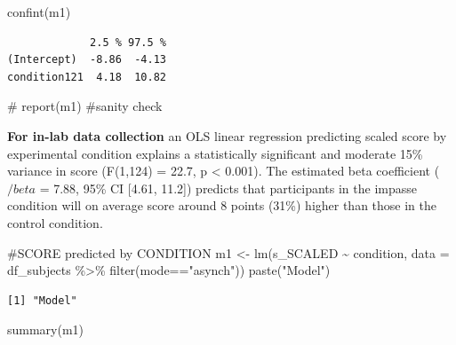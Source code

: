 \documentclass[
  letterpaper,
  DIV=11,
  numbers=noendperiod]{scrreprt}
\newenvironment{Shaded}{\begin{snugshade}}{\end{snugshade}}
\newcommand{\AttributeTok}[1]{\textcolor[rgb]{0.40,0.45,0.13}{#1}}
\newcommand{\CommentTok}[1]{\textcolor[rgb]{0.37,0.37,0.37}{#1}}
\newcommand{\FunctionTok}[1]{\textcolor[rgb]{0.28,0.35,0.67}{#1}}
\newcommand{\NormalTok}[1]{\textcolor[rgb]{0.00,0.23,0.31}{#1}}
\newcommand{\OtherTok}[1]{\textcolor[rgb]{0.00,0.23,0.31}{#1}}
\newcommand{\SpecialCharTok}[1]{\textcolor[rgb]{0.37,0.37,0.37}{#1}}
\newcommand{\StringTok}[1]{\textcolor[rgb]{0.13,0.47,0.30}{#1}}
\begin{document}
\begin{Shaded}
\begin{Highlighting}[]
\FunctionTok{confint}\NormalTok{(m1)}
\end{Highlighting}
\end{Shaded}

\begin{verbatim}
             2.5 % 97.5 %
(Intercept)  -8.86  -4.13
condition121  4.18  10.82
\end{verbatim}

\begin{Shaded}
\begin{Highlighting}[]
\CommentTok{\# report(m1) \#sanity check}
\end{Highlighting}
\end{Shaded}

\textbf{For in-lab data collection} an OLS linear regression predicting
scaled score by experimental condition explains a statistically
significant and moderate 15\% variance in score (F(1,124) = 22.7, p
\textless{} 0.001). The estimated beta coefficient (\(/beta\) = 7.88,
95\% CI {[}4.61, 11.2{]}) predicts that participants in the impasse
condition will on average score around 8 points (31\%) higher than those
in the control condition.

\begin{Shaded}
\begin{Highlighting}[]
\CommentTok{\#SCORE predicted by CONDITION}
\NormalTok{m1 }\OtherTok{\textless{}{-}} \FunctionTok{lm}\NormalTok{(s\_SCALED }\SpecialCharTok{\textasciitilde{}}\NormalTok{ condition, }\AttributeTok{data =}\NormalTok{ df\_subjects }\SpecialCharTok{\%\textgreater{}\%} \FunctionTok{filter}\NormalTok{(mode}\SpecialCharTok{==}\StringTok{"asynch"}\NormalTok{))}
\FunctionTok{paste}\NormalTok{(}\StringTok{"Model"}\NormalTok{)}
\end{Highlighting}
\end{Shaded}

\begin{verbatim}
[1] "Model"
\end{verbatim}

\begin{Shaded}
\begin{Highlighting}[]
\FunctionTok{summary}\NormalTok{(m1)}
\end{Highlighting}
\end{Shaded}
\end{document}
